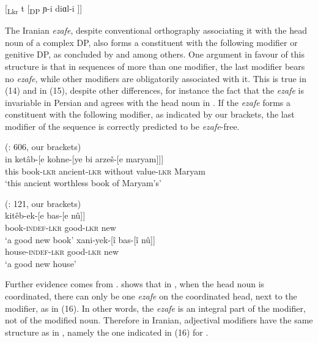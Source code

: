 \documentclass[output=paper]{langsci/langscibook}
\begin{document}
\ea%
    \label{ex:manzini:13}
    [\textsubscript{Lkr} t  [\textsubscript{DP} ɲ-i diɑl-i ]]     
\z

The Iranian \textit{ezafe}, despite conventional orthography associating it with the head noun of a complex DP, also forms a constituent with the following modifier  or genitive DP, as concluded by \citet{Larson2008} and \citet{Philip2012} among others. One argument in favour of this structure is that in sequences of more than one modifier, the last modifier bears no \textit{ezafe}, while other modifiers are obligatorily associated with it. This is true in  (14) and in   (15), despite other differences, for instance the fact that the \textit{ezafe} is invariable in Persian and agrees with the head noun in . If the \textit{ezafe} forms a constituent with the following modifier, as indicated by our brackets, the last modifier of the sequence is correctly predicted to be \textit{ezafe}{}-free. 

\ea%
          (\citealt{Samvelian2007}: 606, our brackets)\label{ex:manzini:14}\\
    \gll in   ketâb-[e   kohne-[ye   bi arzeš-[e     maryam]]]\\
         this   book{}-\textsc{lkr}    ancient{}-\textsc{lkr}    without value{}-\textsc{lkr}    Maryam\\
    \glt ‘this ancient worthless book of Maryam’s’     
    \z

  
\ea%
     (\citealt{Yamakido2005}: 121, our brackets)\label{ex:manzini:15}\\
    \ea
    \gll kitêb-ek-[e    bas-[e    nû]]\\
         book-\textsc{indef-lkr}   good-\textsc{lkr}   new\\
    \glt ‘a good new book’
    \ex  
    \gll xani-yek-[î    bas-[î    nû]]\\
         house-\textsc{indef-lkr}   good-\textsc{lkr}   new\\
    \glt ‘a good new house’
    \z
\z    

Further evidence comes from . \citet[37ff.]{Philip2012} shows that in , when the head noun is coordinated, there can only be one \textit{ezafe} on the coordinated head, next to the modifier, as in (16). In other words, the \textit{ezafe} is an integral part of the modifier, not of the modified noun. Therefore in Iranian, adjectival modifiers have the same structure as in , namely the one indicated in (16) for .
\end{document}
